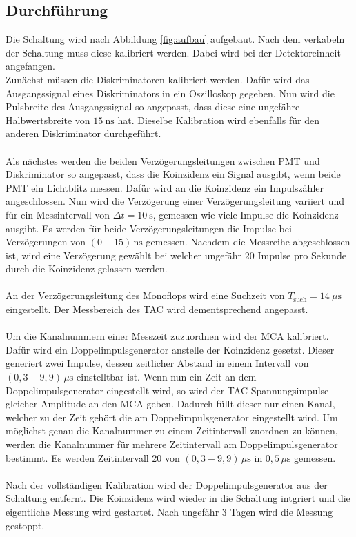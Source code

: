 \subsection{Durchführung}
Die Schaltung wird nach Abbildung \ref{fig:aufbau} aufgebaut.
Nach dem verkabeln der Schaltung muss diese kalibriert werden.
Dabei wird bei der Detektoreinheit angefangen.\\
Zunächst müssen die Diskriminatoren kalibriert werden.
Dafür wird das Ausgangssignal eines Diskriminators in ein Oszilloskop gegeben.
Nun wird die Pulsbreite des Ausgangssignal so angepasst, dass diese eine ungefähre Halbwertsbreite von $\SI{15}{\nano\second}$ hat.
Dieselbe Kalibration wird ebenfalls für den anderen Diskriminator durchgeführt.\\\\
Als nächstes werden die beiden Verzögerungsleitungen zwischen PMT und Diskriminator so angepasst, dass die Koinzidenz ein Signal ausgibt, wenn beide PMT ein Lichtblitz messen.
Dafür wird an die Koinzidenz ein Impulszähler angeschlossen.
Nun wird die Verzögerung einer Verzögerungsleitung variiert und für ein Messintervall von $\Delta t = \SI{10}{\second}$, gemessen wie viele Impulse die Koinzidenz ausgibt.
Es werden für beide Verzögerungsleitungen die Impulse bei Verzögerungen von $(0-15)\,\si{\nano\second}$ gemessen.
Nachdem die Messreihe abgeschlossen ist, wird eine Verzögerung gewählt bei welcher ungefähr 20 Impulse pro Sekunde durch die Koinzidenz gelassen werden.\\\\
An der Verzögerungsleitung des Monoflops wird eine Suchzeit von $T_\text{such} = \SI{14}{\mu\second}$ eingestellt.
Der Messbereich des TAC wird dementsprechend angepasst.\\\\
Um die Kanalnummern einer Messzeit zuzuordnen wird der MCA kalibriert.
Dafür wird ein Doppelimpulsgenerator anstelle der Koinzidenz gesetzt.
Dieser generiert zwei Impulse, dessen zeitlicher Abstand in einem Intervall von $(0,3-9,9)\,\si{\mu\second}$ einstelltbar ist.
Wenn nun ein Zeit an dem Doppelimpulsgenerator eingestellt wird, so wird der TAC Spannungsimpulse gleicher Amplitude an den MCA geben.
Dadurch füllt dieser nur einen Kanal, welcher zu der Zeit gehört die am Doppelimpulsgenerator eingestellt wird.
Um möglichst genau die Kanalnummer zu einem Zeitintervall zuordnen zu können, werden die Kanalnummer für mehrere Zeitintervall am Doppelimpulsgenerator bestimmt.
Es werden Zeitintervall 20 von $(0,3-9,9)\,\si{\mu\second}$ in $0,5\,\si{\mu\second}$ gemessen.\\\\
Nach der vollständigen Kalibration wird der Doppelimpulsgenerator aus der Schaltung entfernt.
Die Koinzidenz wird wieder in die Schaltung intgriert und die eigentliche Messung wird gestartet.
Nach ungefähr 3 Tagen wird die Messung gestoppt.